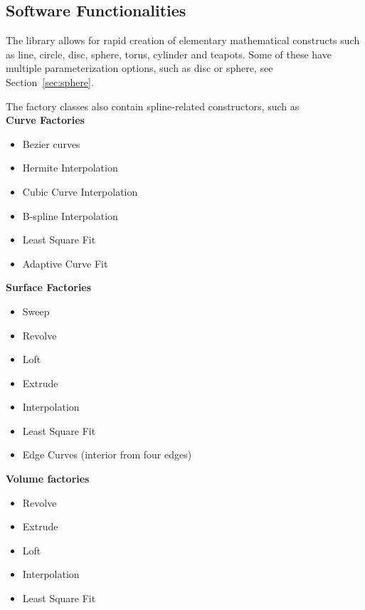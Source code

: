 \documentclass[preprint,12pt, a4paper]{elsarticle}
\begin{document}
\subsection{Software Functionalities}
\label{sec:functionality}

The library allows for rapid creation of elementary mathematical constructs such as line, circle, disc, sphere, torus, cylinder and teapots.
Some of these have multiple parameterization options, such as disc or sphere, see Section~\ref{sec:sphere}.

The factory classes also contain spline-related constructors, such as \\
\textbf{Curve Factories}
\begin{itemize}
    \setlength\itemsep{-.5em}
    \item Bezier curves
    \item Hermite Interpolation
    \item Cubic Curve Interpolation
    \item B-spline Interpolation
    \item Least Square Fit
    \item Adaptive Curve Fit
\end{itemize}
\textbf{Surface Factories}
\begin{itemize}
    \setlength\itemsep{-.5em}
    \item Sweep
    \item Revolve
    \item Loft
    \item Extrude
    \item Interpolation
    \item Least Square Fit
    \item Edge Curves (interior from four edges)
\end{itemize}
\textbf{Volume factories}
\begin{itemize}
    \setlength\itemsep{-.5em}
    \item Revolve
    \item Extrude
    \item Loft
    \item Interpolation
    \item Least Square Fit
\end{itemize}
\end{document}
